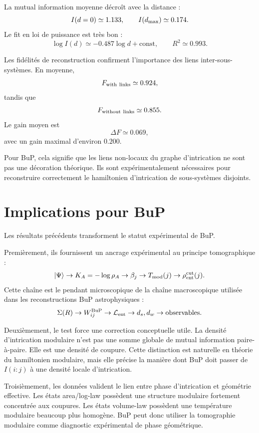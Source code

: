 \documentclass[11pt,a4paper]{article}
\begin{document}
La mutual information moyenne décroît avec la distance :
\[
I(d=0)\simeq1.133,
\qquad
I(d_{\rm max})\simeq0.174.
\]
Le fit en loi de puissance est très bon :
\[
\log I(d)
\simeq
-0.487\log d+\mathrm{const},
\qquad
R^2\simeq0.993.
\]

Les fidélités de reconstruction confirment l'importance des liens inter-sous-systèmes. En moyenne,
\[
F_{\rm with\ links}\simeq0.924,
\]
tandis que
\[
F_{\rm without\ links}\simeq0.855.
\]
Le gain moyen est
\[
\Delta F\simeq0.069,
\]
avec un gain maximal d'environ $0.200$.

Pour BuP, cela signifie que les liens non-locaux du graphe d'intrication ne sont pas une décoration théorique. Ils sont expérimentalement nécessaires pour reconstruire correctement le hamiltonien d'intrication de sous-systèmes disjoints.

\section{Implications pour BuP}

Les résultats précédents transforment le statut expérimental de BuP.

Premièrement, ils fournissent un ancrage expérimental au principe tomographique :
\[
|\Psi\rangle
\rightarrow
K_A=-\log\rho_A
\rightarrow
\beta_j
\rightarrow
T_{\rm mod}(j)
\rightarrow
\rho_{\rm ent}^{\rm cut}(j).
\]
Cette chaîne est le pendant microscopique de la chaîne macroscopique utilisée dans les reconstructions BuP astrophysiques :
\[
\Sigma(R)
\rightarrow
W_{ij}^{\rm BuP}
\rightarrow
\mathcal L_{\rm ent}
\rightarrow
d_s,d_w
\rightarrow
\mathrm{observables}.
\]

Deuxièmement, le test force une correction conceptuelle utile. La densité d'intrication modulaire n'est pas une somme globale de mutual information paire-à-paire. Elle est une densité de coupure. Cette distinction est naturelle en théorie du hamiltonien modulaire, mais elle précise la manière dont BuP doit passer de $I(i:j)$ à une densité locale d'intrication.

Troisièmement, les données valident le lien entre phase d'intrication et géométrie effective. Les états area/log-law possèdent une structure modulaire fortement concentrée aux coupures. Les états volume-law possèdent une température modulaire beaucoup plus homogène. BuP peut donc utiliser la tomographie modulaire comme diagnostic expérimental de phase géométrique.
\end{document}
